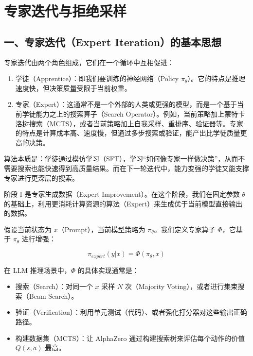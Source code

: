 \setcounter{section}{2}

\hypertarget{ux4e13ux5bb6ux8fedux4ee3ux4e0eux62d2ux7eddux91c7ux6837}{%
\section{专家迭代与拒绝采样}\label{ux4e13ux5bb6ux8fedux4ee3ux4e0eux62d2ux7eddux91c7ux6837}}

\hypertarget{ux4e00ux4e13ux5bb6ux8fedux4ee3expert-iterationux7684ux57faux672cux601dux60f3}{%
\subsection{一、专家迭代（Expert Iteration）的基本思想}\label{ux4e00ux4e13ux5bb6ux8fedux4ee3expert-iterationux7684ux57faux672cux601dux60f3}}

专家迭代由两个角色组成，它们在一个循环中互相促进：

\begin{enumerate}
\def\labelenumi{\arabic{enumi}.}
\tightlist
\item
  学徒（Apprentice）：即我们要训练的神经网络（Policy \(\pi_\theta\)）。它的特点是推理速度快，但决策质量受限于当前权重。
\item
  专家（Expert）：这通常不是一个外部的人类或更强的模型，而是一个基于当前学徒能力之上的搜索算子（Search Operator）。例如，当前策略加上蒙特卡洛树搜索（MCTS），或者当前策略加上自我采样、重排序、验证器等。专家的特点是计算成本高、速度慢，但通过多步搜索或验证，能产出比学徒质量更高的决策。
\end{enumerate}

算法本质是：学徒通过模仿学习（SFT），学习``如何像专家一样做决策''，从而不需要搜索也能快速得到高质量结果。而在下一轮迭代中，能力变强的学徒又能支撑专家进行更深层的搜索。

阶段 I 是专家生成数据（Expert Improvement）。在这个阶段，我们在固定参数 \(\theta\) 的基础上，利用更消耗计算资源的算法（Expert）来生成优于当前模型直接输出的数据。

假设当前状态为 \(x\)（Prompt），当前模型策略为 \(\pi_\theta\)。我们定义专家算子 \(\Phi\)，它基于 \(\pi_\theta\) 进行增强：

\[
\pi_{expert}(y|x)=\Phi(\pi_\theta,x)
\]

在 LLM 推理场景中，\(\Phi\) 的具体实现通常是：

\begin{itemize}
\tightlist
\item
  搜索（Search）：对同一个 \(x\) 采样 \(N\) 次（Majority Voting），或者进行集束搜索（Beam Search）。
\item
  验证（Verification）：利用单元测试（代码）、或者强化打分器对这些输出正确路径。
\item
  构建数据集（MCTS）：让 AlphaZero 通过构建搜索树来评估每个动作的价值 \(Q(s,a)\) 最高。
\end{itemize}

